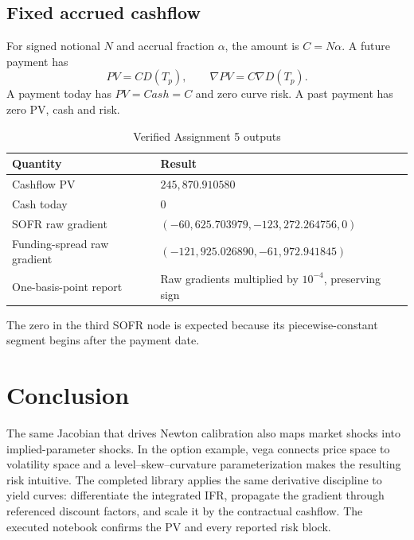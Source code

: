 \documentclass[11pt]{article}
\numberwithin{equation}{section}
\begin{document}
\subsection{Fixed accrued cashflow}
For signed notional $N$ and accrual fraction $\alpha$, the amount is
$C=N\alpha$. A future payment has
\begin{equation}
PV=CD(T_p),\qquad \nabla PV=C\nabla D(T_p).
\end{equation}
A payment today has $PV=Cash=C$ and zero curve risk. A past payment has zero
PV, cash and risk.

\begin{table}[H]
\centering
\caption{Verified Assignment 5 outputs}
\small
\begin{tabularx}{\textwidth}{@{}L{4.1cm}Y@{}}
\toprule{}\textbf{Quantity}&\textbf{Result}\\\midrule
Cashflow PV & $245{,}870.910580$\\
Cash today & $0$\\
SOFR raw gradient & $(-60{,}625.703979,-123{,}272.264756,0)$\\
Funding-spread raw gradient & $(-121{,}925.026890,-61{,}972.941845)$\\
One-basis-point report & Raw gradients multiplied by $10^{-4}$, preserving sign\\
\bottomrule
\end{tabularx}
\end{table}
The zero in the third SOFR node is expected because its piecewise-constant
segment begins after the payment date.

\section{Conclusion}
The same Jacobian that drives Newton calibration also maps market shocks into
implied-parameter shocks. In the option example, vega connects price space to
volatility space and a level--skew--curvature parameterization makes the
resulting risk intuitive. The completed library applies the same derivative
discipline to yield curves: differentiate the integrated IFR, propagate the
gradient through referenced discount factors, and scale it by the contractual
cashflow. The executed notebook confirms the PV and every reported risk block.
\end{document}
